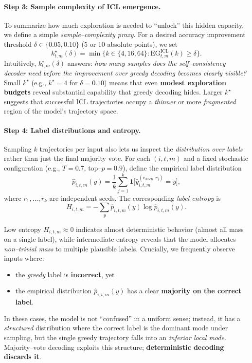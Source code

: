 \paragraph{\textbf{Step 3: Sample complexity of ICL emergence.}}
To summarize how much exploration is needed to ``unlock'' this hidden
capacity, we define a simple \emph{sample--complexity proxy}. For a desired
accuracy improvement threshold $\delta\in\{0.05, 0.10\}$ (5 or 10 absolute
points), we set
\[
k^{\star}_{t,m}(\delta)
= \min\big\{ k\in\{4,16,64\} :
\mathrm{EG}^{\text{ICL}}_{t,m}(k) \ge \delta \big\}.
\]
Intuitively, $k^{\star}_{t,m}(\delta)$ answers:
\emph{how many samples does the self--consistency decoder need before the
improvement over greedy decoding becomes clearly visible?} Small
$k^{\star}$ (e.g., $k^{\star}{=}4$ for $\delta{=}0.10$) means that even
\textbf{modest exploration budgets} reveal substantial capability that
greedy decoding hides. Larger $k^{\star}$ suggests that successful ICL
trajectories occupy a \emph{thinner} or more \emph{fragmented} region of
the model's trajectory space.

\vspace{0.3em}
\paragraph{\textbf{Step 4: Label distributions and entropy.}}
Sampling $k$ trajectories per input also lets us inspect the
\emph{distribution over labels} rather than just the final majority vote.
For each $(i,t,m)$ and a fixed stochastic configuration (e.g.,
$T{=}0.7$, top--$p{=}0.9$), define the empirical label distribution
\[
\hat{p}_{i,t,m}(y)
= \frac{1}{k} \sum_{j=1}^{k}
  \mathbf{1}\big[ \hat{y}^{(e_{\text{stoch}},r_j)}_{i,t,m} = y \big],
\]
where $r_1,\dots,r_k$ are independent seeds. The corresponding
\emph{label entropy} is
\[
H_{i,t,m}
= - \sum_{y} \hat{p}_{i,t,m}(y)
    \log \hat{p}_{i,t,m}(y).
\]

Low entropy $H_{i,t,m}\approx 0$ indicates almost deterministic behavior
(almost all mass on a single label), while intermediate entropy reveals
that the model allocates \emph{non--trivial mass} to multiple plausible
labels. Crucially, we frequently observe inputs where:
\begin{itemize}[leftmargin=1.5em]
  \item the \emph{greedy} label is \textbf{incorrect}, yet
  \item the empirical distribution $\hat{p}_{i,t,m}(y)$ has a clear
        \textbf{majority on the correct label}.
\end{itemize}
In these cases, the model is not ``confused'' in a uniform sense; instead,
it has a \emph{structured} distribution where the correct label is the
dominant mode under sampling, but the single greedy trajectory falls into an
\emph{inferior local mode}. Majority--vote decoding exploits this structure;
\textbf{deterministic decoding discards it}.

